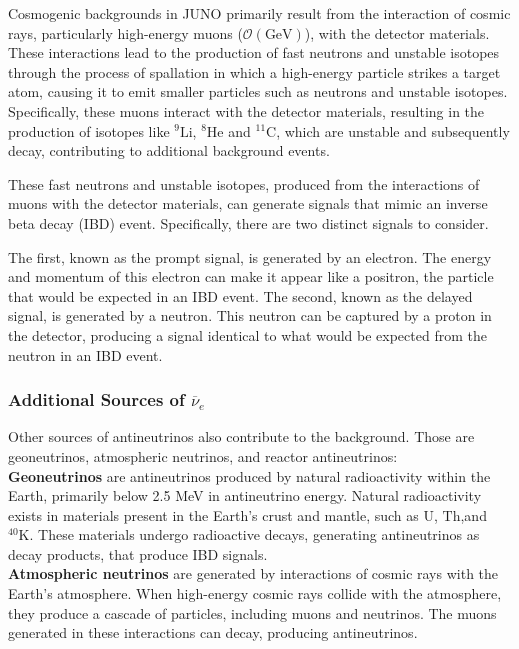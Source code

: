 Cosmogenic backgrounds in JUNO primarily result from the interaction of cosmic rays, particularly high-energy muons ($\mathcal{O}(\text{GeV})$), with the detector materials. These interactions lead to the production of fast neutrons and unstable isotopes through the process of spallation in which a high-energy particle strikes a target atom, causing it to emit smaller particles such as neutrons and unstable isotopes. Specifically, these muons interact with the detector materials, resulting in the production of isotopes like  $^{9}\mathrm{Li}$, $^{8}\mathrm{He}$ and $^{11}\mathrm{C}$, which are unstable and subsequently decay, contributing to additional background events.

These fast neutrons and unstable isotopes, produced from the interactions of muons with the detector materials, can generate signals that mimic an inverse beta decay (IBD) event. Specifically, there are two distinct signals to consider.

The first, known as the prompt signal, is generated by an electron. The energy and momentum of this electron can make it appear like a positron, the particle that would be expected in an IBD event. The second, known as the delayed signal, is generated by a neutron. This neutron can be captured by a proton in the detector, producing a signal identical to what would be expected from the neutron in an IBD event.


\subsubsection*{Additional Sources of $\overline{\nu}_e$}

Other sources of antineutrinos also contribute to the background. Those are geoneutrinos, atmospheric neutrinos, and reactor antineutrinos:\\

\textbf{Geoneutrinos} are antineutrinos produced by natural radioactivity within the Earth, primarily below 2.5 MeV in antineutrino energy. Natural radioactivity exists in materials present in the Earth's crust and mantle, such as $\mathrm{U}$, $\mathrm{Th}$,and $^{40}\mathrm{K}$. These materials undergo radioactive decays, generating antineutrinos as decay products, that produce IBD signals.\\

\textbf{Atmospheric neutrinos} are generated by interactions of cosmic rays with the Earth's atmosphere. When high-energy cosmic rays collide with the atmosphere, they produce a cascade of particles, including muons and neutrinos. The muons generated in these interactions can decay, producing antineutrinos.\\

